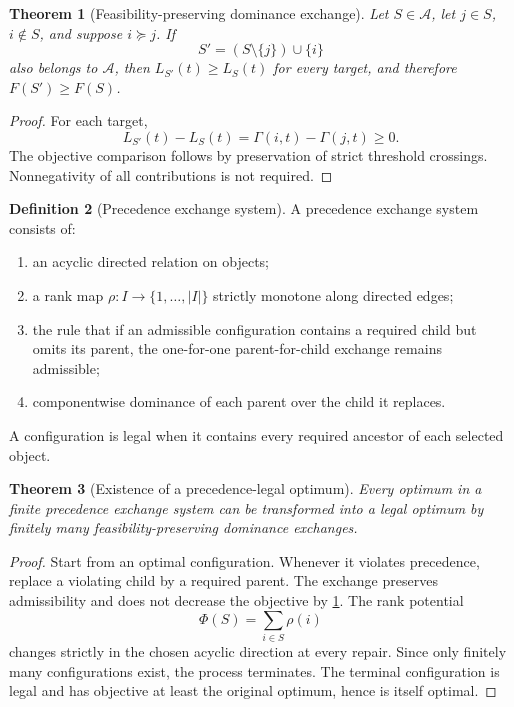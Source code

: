 \documentclass[11pt]{article}
\newtheorem{theorem}{Theorem}[section]
\theoremstyle{definition}
\newtheorem{definition}[theorem]{Definition}
\theoremstyle{remark}
\begin{document}
\begin{theorem}[Feasibility-preserving dominance exchange]\label{thm:exchange}
Let $S\in\mathcal A$, let $j\in S$, $i\notin S$, and suppose $i\succeq j$. If
\[
S'=(S\setminus\{j\})\cup\{i\}
\]
also belongs to $\mathcal A$, then $L_{S'}(t)\ge L_S(t)$ for every target, and therefore $F(S')\ge F(S)$.
\end{theorem}

\begin{proof}
For each target,
\[
L_{S'}(t)-L_S(t)=\Gamma(i,t)-\Gamma(j,t)\ge0.
\]
The objective comparison follows by preservation of strict threshold crossings. Nonnegativity of all contributions is not required.
\end{proof}

\begin{definition}[Precedence exchange system]\label{def:precedence-system}
A precedence exchange system consists of:
\begin{enumerate}[label=(\roman*)]
\item an acyclic directed relation on objects;
\item a rank map $\rho:I\to\{1,\ldots,|I|\}$ strictly monotone along directed edges;
\item the rule that if an admissible configuration contains a required child but omits its parent, the one-for-one parent-for-child exchange remains admissible;
\item componentwise dominance of each parent over the child it replaces.
\end{enumerate}
A configuration is legal when it contains every required ancestor of each selected object.
\end{definition}

\begin{theorem}[Existence of a precedence-legal optimum]\label{thm:legal-optimum}
Every optimum in a finite precedence exchange system can be transformed into a legal optimum by finitely many feasibility-preserving dominance exchanges.
\end{theorem}

\begin{proof}
Start from an optimal configuration. Whenever it violates precedence, replace a violating child by a required parent. The exchange preserves admissibility and does not decrease the objective by \cref{thm:exchange}. The rank potential
\[
\Phi(S)=\sum_{i\in S}\rho(i)
\]
changes strictly in the chosen acyclic direction at every repair. Since only finitely many configurations exist, the process terminates. The terminal configuration is legal and has objective at least the original optimum, hence is itself optimal.
\end{proof}
\end{document}
